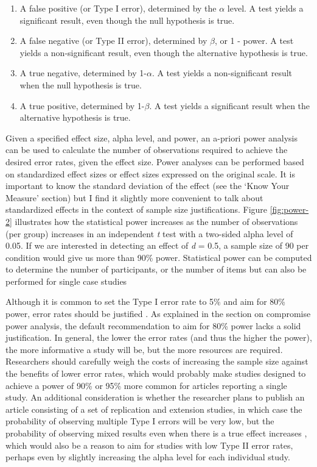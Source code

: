 \documentclass[
  oneside]{book}
\providecommand{\tightlist}{%
  \setlength{\itemsep}{0pt}\setlength{\parskip}{0pt}}
\begin{document}
\begin{enumerate}
\def\labelenumi{\arabic{enumi}.}
\tightlist
\item
  A false positive (or Type I error), determined by the \(\alpha\) level. A test yields a significant result, even though the null hypothesis is true.
\item
  A false negative (or Type II error), determined by \(\beta\), or 1 - power. A test yields a non-significant result, even though the alternative hypothesis is true.
\item
  A true negative, determined by 1-\(\alpha\). A test yields a non-significant result when the null hypothesis is true.
\item
  A true positive, determined by 1-\(\beta\). A test yields a significant result when the alternative hypothesis is true.
\end{enumerate}

Given a specified effect size, alpha level, and power, an a-priori power analysis can be used to calculate the number of observations required to achieve the desired error rates, given the effect size. Power analyses can be performed based on standardized effect sizes or effect sizes expressed on the original scale. It is important to know the standard deviation of the effect (see the `Know Your Measure' section) but I find it slightly more convenient to talk about standardized effects in the context of sample size justifications. Figure \ref{fig:power-2} illustrates how the statistical power increases as the number of observations (per group) increases in an independent \emph{t} test with a two-sided alpha level of 0.05. If we are interested in detecting an effect of \emph{d} = 0.5, a sample size of 90 per condition would give us more than 90\% power. Statistical power can be computed to determine the number of participants, or the number of items \citep{westfall_statistical_2014} but can also be performed for single case studies \citep{ferron_power_1996, mcintosh_power_2020}

Although it is common to set the Type I error rate to 5\% and aim for 80\% power, error rates should be justified \citep{lakens_justify_2018}. As explained in the section on compromise power analysis, the default recommendation to aim for 80\% power lacks a solid justification. In general, the lower the error rates (and thus the higher the power), the more informative a study will be, but the more resources are required. Researchers should carefully weigh the costs of increasing the sample size against the benefits of lower error rates, which would probably make studies designed to achieve a power of 90\% or 95\% more common for articles reporting a single study. An additional consideration is whether the researcher plans to publish an article consisting of a set of replication and extension studies, in which case the probability of observing multiple Type I errors will be very low, but the probability of observing mixed results even when there is a true effect increases \citep{lakens_too_2017}, which would also be a reason to aim for studies with low Type II error rates, perhaps even by slightly increasing the alpha level for each individual study.
\end{document}
